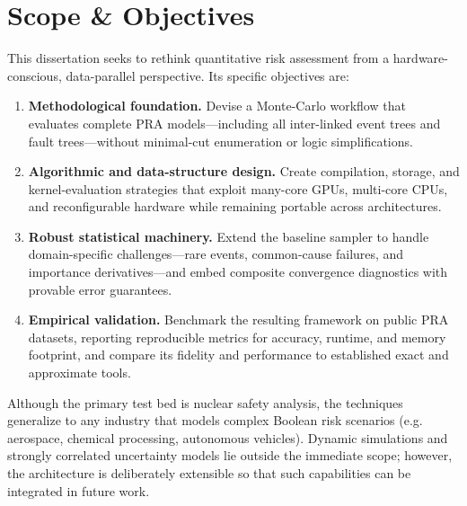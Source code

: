 \section{Scope \& Objectives}
This dissertation seeks to rethink quantitative risk assessment from a hardware-conscious, data-parallel perspective.  Its specific objectives are:

\begin{enumerate}[label=\textbf{O\arabic*}.,leftmargin=2em]
  \item \textbf{Methodological foundation.}  Devise a Monte-Carlo workflow that evaluates complete PRA models—including all inter-linked event trees and fault trees—without minimal-cut enumeration or logic simplifications.
  \item \textbf{Algorithmic and data-structure design.}  Create compilation, storage, and kernel-evaluation strategies that exploit many-core GPUs, multi-core CPUs, and reconfigurable hardware while remaining portable across architectures.
  \item \textbf{Robust statistical machinery.}  Extend the baseline sampler to handle domain-specific challenges—rare events, common-cause failures, and importance derivatives—and embed composite convergence diagnostics with provable error guarantees.
  \item \textbf{Empirical validation.}  Benchmark the resulting framework on public PRA datasets, reporting reproducible metrics for accuracy, runtime, and memory footprint, and compare its fidelity and performance to established exact and approximate tools.
\end{enumerate}

Although the primary test bed is nuclear safety analysis, the techniques generalize to any industry that models complex Boolean risk scenarios (e.g.\, aerospace, chemical processing, autonomous vehicles).  Dynamic simulations and strongly correlated uncertainty models lie outside the immediate scope; however, the architecture is deliberately extensible so that such capabilities can be integrated in future work.